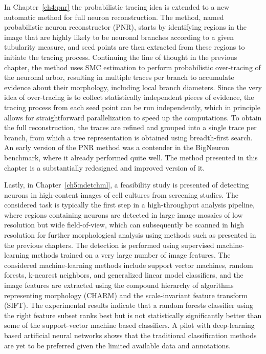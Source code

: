 In Chapter~\ref{ch4:pnr} the probabilistic tracing idea is extended to a new automatic method for full neuron reconstruction. The method, named probabilistic neuron reconstructor (PNR), starts by identifying regions in the image that are highly likely to be neuronal branches according to a given tubularity measure, and seed points are then extracted from these regions to initiate the tracing process. Continuing the line of thought in the previous chapter, the method uses SMC estimation to perform probabilistic over-tracing of the neuronal arbor, resulting in multiple traces per branch to accumulate evidence about their morphology, including local branch diameters. Since the very idea of over-tracing is to collect statistically independent pieces of evidence, the tracing process from each seed point can be run independently, which in principle allows for straightforward parallelization to speed up the computations. To obtain the full reconstruction, the traces are refined and grouped into a single trace per branch, from which a tree representation is obtained using breadth-first search. An early version of the PNR method was a contender in the BigNeuron benchmark, where it already performed quite well. The method presented in this chapter is a substantially redesigned and improved version of it.

Lastly, in Chapter~\ref{ch5:ndetchml}, a feasibility study is presented of detecting neurons in high-content images of cell cultures from screening studies. The considered task is typically the first step in a high-throughput analysis pipeline, where regions containing neurons are detected in large image mosaics of low resolution but wide field-of-view, which can subsequently be scanned in high resolution for further morphological analysis using methods such as presented in the previous chapters. The detection is performed using supervised machine-learning methods trained on a very large number of image features. The considered machine-learning methods include support vector machines, random forests, k-nearest neighbors, and generalized linear model classifiers, and the image features are extracted using the compound hierarchy of algorithms representing morphology (CHARM) and the scale-invariant feature transform (SIFT). The experimental results indicate that a random forests classifier using the right feature subset ranks best but is not statistically significantly better than some of the support-vector machine based classifiers. A pilot with deep-learning based artificial neural networks shows that the traditional classification methods are yet to be preferred given the limited available data and annotations.